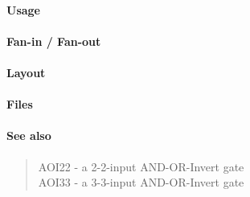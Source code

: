 \paragraph{Usage}

\paragraph{Fan-in / Fan-out}

\paragraph{Layout}

\paragraph{Files}

\paragraph{See also}
\begin{quote}
    AOI22 - a 2-2-input AND-OR-Invert gate \\
    AOI33 - a 3-3-input AND-OR-Invert gate
\end{quote}
